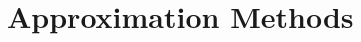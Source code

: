 \documentclass[../main.tex]{subfiles}
\begin{document}
\part{Approximation Methods}
\label{partII-approx}



\end{document}
